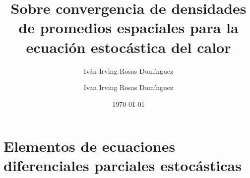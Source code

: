 \documentclass[letterpaper,twoside,12pt]{book}
\title{\textbf{}}
\author{Iván Irving Rosas Domínguez}
\date{\today}
\author{Ivan Irving Rosas Domínguez}
\title{Sobre convergencia de densidades de promedios espaciales para la ecuación estocástica del calor}
\newcommand{\1}{\mathds{1}}
\theoremstyle{definition}
\theoremstyle{definition}
\theoremstyle{definition}
\theoremstyle{definition}
\theoremstyle{definition}
\theoremstyle{definition}
\theoremstyle{definition}
\begin{document}
\maketitle 

\thispagestyle{empty}  

\frontmatter







\tableofcontents







\mainmatter

\chapter{Elementos de ecuaciones diferenciales parciales estocásticas}
\end{document}
